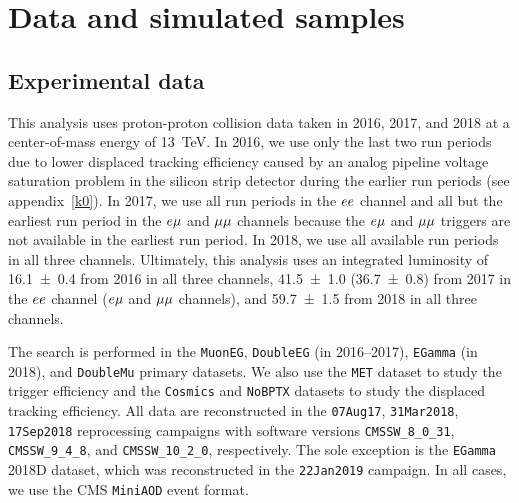 \section{Data and simulated samples}
\label{samples}
\subsection{Experimental data}
This analysis uses proton-proton collision data taken in 2016, 2017, and 2018 at a center-of-mass energy of \SI{13}{\TeV}. In 2016, we use only the last two run periods due to lower displaced tracking efficiency caused by an analog pipeline voltage saturation problem in the silicon strip detector during the earlier run periods (see appendix~\ref{k0}). In 2017, we use all run periods in the $ee$ channel and all but the earliest run period in the $e{\mu}$ and ${\mu}{\mu}$ channels because the $e{\mu}$ and ${\mu}{\mu}$ triggers are not available in the earliest run period. In 2018, we use all available run periods in all three channels. Ultimately, this analysis uses an integrated luminosity of \SI{16.1\pm0.4}{\fb} from 2016 in all three channels, \SI{41.5\pm1.0}{\fb} (\SI{36.7\pm0.8}{\fb}) from 2017 in the $ee$ channel ($e{\mu}$ and ${\mu}{\mu}$ channels), and \SI{59.7\pm1.5}{\fb} from 2018 in all three channels.

The search is performed in the \texttt{MuonEG}, \texttt{DoubleEG} (in 2016--2017), \texttt{EGamma} (in 2018), and \texttt{DoubleMu} primary datasets. We also use the \texttt{MET} dataset to study the trigger efficiency and the \texttt{Cosmics} and \texttt{NoBPTX} datasets to study the displaced tracking efficiency. All data are reconstructed in the \texttt{07Aug17}, \texttt{31Mar2018}, \texttt{17Sep2018} reprocessing campaigns with software versions \texttt{CMSSW\_8\_0\_31}, \texttt{CMSSW\_9\_4\_8}, and \texttt{CMSSW\_10\_2\_0}, respectively. The sole exception is the \texttt{EGamma} 2018D dataset, which was reconstructed in the \texttt{22Jan2019} campaign. In all cases, we use the CMS \texttt{MiniAOD} event format.

